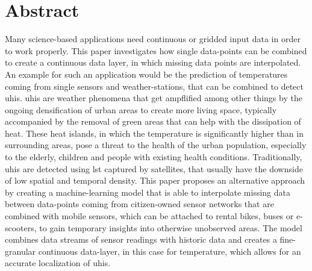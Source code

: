 \chapter*{Abstract}
Many science-based applications need continuous or gridded input data in order to work properly. This paper investigates how single data-points can be combined to create a continuous data layer, in which missing data points are interpolated. An example for such an application would be the prediction of temperatures coming from single sensors and weather-stations, that can be combined to detect \gls{uhi}s. \gls{uhi}s are weather phenomena that get ampflified among other things by the ongoing densification of urban areas to create more living space, typically accompanied by the removal of green areas that can help with the dissipation of heat. These heat islands, in which the temperature is significantly higher than in surrounding areas, pose a threat to the health of the urban population, especially to the elderly, children and people with existing health conditions. Traditionally, \gls{uhi}s are detected using \gls{lst} captured by satellites, that usually have the downside of low spatial and temporal density. This paper proposes an alternative approach by creating a machine-learning model that is able to interpolate missing data between data-points coming from citizen-owned sensor networks that are combined with mobile sensors, which can be attached to rental bikes, buses or e-scooters, to gain temporary insights into otherwise unobserved areas. The model combines data streams of sensor readings with historic data and creates a fine-granular continuous data-layer, in this case for temperature, which allows for an accurate localization of \gls{uhi}s.